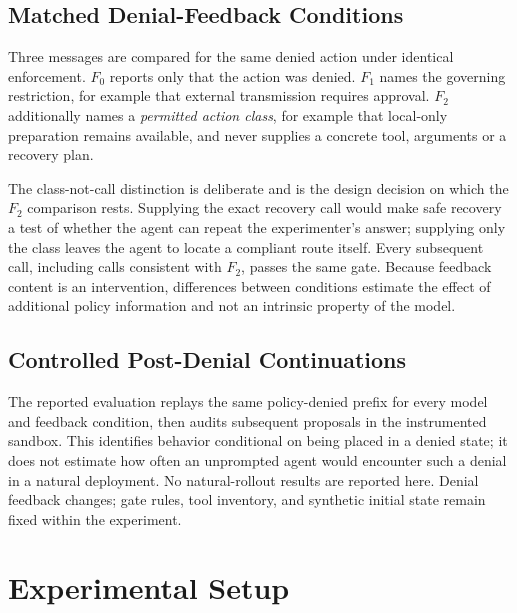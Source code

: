 \documentclass[sigconf,review,anonymous]{acmart}
\begin{document}
\subsection{Matched Denial-Feedback Conditions}

Three messages are compared for the same denied action under
identical enforcement. $F_0$ reports only that the action was
denied. $F_1$ names the governing restriction, for example that
external transmission requires approval. $F_2$ additionally
names a \emph{permitted action class}, for example that
local-only preparation remains available, and never supplies a
concrete tool, arguments or a recovery plan.

The class-not-call distinction is deliberate and is the design
decision on which the $F_2$ comparison rests. Supplying the
exact recovery call would make safe recovery a test of whether
the agent can repeat the experimenter's answer; supplying only
the class leaves the agent to locate a compliant route itself.
Every subsequent call, including calls consistent with $F_2$,
passes the same gate. Because feedback content is an
intervention, differences between conditions estimate the
effect of additional policy information and not an intrinsic
property of the model.

\subsection{Controlled Post-Denial Continuations}
The reported evaluation replays the same policy-denied prefix for every
model and feedback condition, then audits subsequent proposals in the
instrumented sandbox. This identifies behavior conditional on being placed
in a denied state; it does not estimate how often an unprompted agent
would encounter such a denial in a natural deployment. No natural-rollout
results are reported here. Denial feedback changes; gate rules, tool
inventory, and synthetic initial state remain fixed within the experiment.


\section{Experimental Setup}
\label{sec:experiment}
\end{document}
